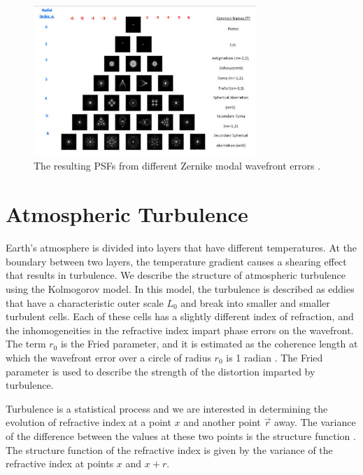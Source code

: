 \begin{figure}
    \centering
    \includegraphics[width=0.75\textwidth]{Chapter Materials/Introduction Materials/Introduction Figures/ZernikePSFs.png}
    \caption{The resulting PSFs from different Zernike modal wavefront errors \citep{masalehdan2010modeling}.}
    \label{fig:zernikePSFs}
\end{figure}

\section{Atmospheric Turbulence}


Earth’s atmosphere is divided into layers that have different temperatures. At the boundary between two layers, the temperature gradient causes a shearing effect that results in turbulence. We describe the structure of atmospheric turbulence using the Kolmogorov model. In this model, the turbulence is described as eddies that have a characteristic outer scale $L_0$ and break into smaller and smaller turbulent cells. Each of these cells has a slightly different index of refraction, and the inhomogeneities in the refractive index impart phase errors on the wavefront. The term $r_0$ is the Fried parameter, and it is estimated as the coherence length at which the wavefront error over a circle of radius $r_0$ is 1 radian \citep{roddier1999adaptive}. The Fried parameter is used to describe the strength of the distortion imparted by turbulence.  

Turbulence is a statistical process and we are interested in determining the evolution of refractive index at a point $x$ and another point $\Vec{r}$ away. The variance of the difference between the values at these two points is the structure function \citep{hardy}. The structure function of the refractive index is given by the variance of the refractive index at points $x$ and $x+r$.   

